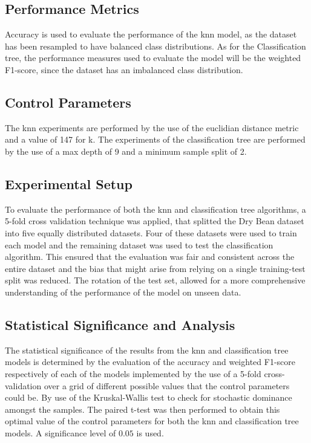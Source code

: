 \documentclass[10pt, conference]{IEEEtran}
\begin{document}
\subsection{Performance Metrics}

Accuracy is used to evaluate the performance of the \acrshort{knn} model, as the dataset has been
resampled to have balanced class distributions. As for the Classification tree, the performance
measures used to evaluate the model will be the weighted F1-score, since the dataset has an
imbalanced class distribution.

\subsection{Control Parameters}

The \acrshort{knn} experiments are performed by the use of the euclidian distance metric and a value of
147 for k. The experiments of the classification tree are performed by the use of a max depth of 9 and
a minimum sample split of 2.

\subsection{Experimental Setup}

To evaluate the performance of both the \acrshort{knn} and classification tree algorithms, a 5-fold cross
validation technique was applied, that splitted the Dry Bean dataset into five equally distributed datasets.
Four of these datasets were used to train each model and the remaining dataset was used to test the
classification algorithm. This ensured that the evaluation was fair and consistent across the entire dataset and
the bias that might arise from relying on a single training-test split was reduced. The rotation of the test set,
allowed for a more comprehensive understanding of the performance of the model on unseen data.

\subsection{Statistical Significance and Analysis}

The statistical significance of the results from the \acrshort{knn} and classification tree models is determined
by the evaluation of the accuracy and weighted F1-score respectively of each of the models implemented by the use
of a 5-fold cross-validation over a grid of different possible values that the control parameters could be. By use of the Kruskal-Wallis
test to check for stochastic dominance amongst the samples. The paired t-test was then performed to obtain this optimal value of the
control parameters for both the \acrshort{knn} and classification tree models. A significance level of $0.05$ is used.
\end{document}
